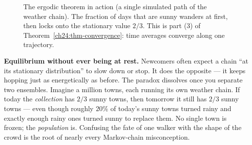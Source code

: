 \begin{figure}[H]
  \centering
  \caption{The ergodic theorem in action (a single simulated path of the weather
  chain). The fraction of days that are sunny wanders at first, then locks onto
  the stationary value $2/3$. This is part (3) of
  Theorem~\ref{ch24:thm-convergence}: time averages converge along one
  trajectory.}
  \label{ch24:fig-ergodic-timeavg}
\end{figure}
\begin{paradoxbox}
\textbf{Equilibrium without ever being at rest.} Newcomers often expect a chain
``at its stationary distribution'' to slow down or stop. It does the opposite ---
it keeps hopping just as energetically as before. The paradox dissolves once you
separate two ensembles. Imagine a million towns, each running its own weather
chain. If today the \emph{collection} has $2/3$ sunny towns, then tomorrow it
still has $2/3$ sunny towns --- even though roughly $20\%$ of today's sunny towns
turned rainy and exactly enough rainy ones turned sunny to replace them. No single
town is frozen; the \emph{population} is. Confusing the fate of one walker with
the shape of the crowd is the root of nearly every Markov-chain misconception.
\end{paradoxbox}
